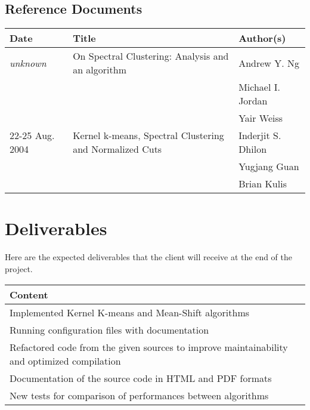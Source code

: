 \subsection{Reference Documents}
\begin{flushleft}
    \begin{tabular}{ | p{} | l | p{} |}
    \hline
    \textbf{Date} & \textbf{Title} & \textbf{Author(s)}
    \\
    \hline
    \textit{unknown} & On Spectral Clustering: Analysis and an algorithm & Andrew Y. Ng
    \\ & & Michael I. Jordan
    \\ & & Yair Weiss
    \\ 
    \hline
    22-25 Aug. 2004 & Kernel k-means, Spectral Clustering and Normalized Cuts & Inderjit S. Dhilon
    \\ & & Yugjang Guan
    \\ & & Brian Kulis
    \\ 
    \hline
    \end{tabular}
\end{flushleft}
\section{Deliverables}
Here are the expected deliverables that the client will receive at the end of the project.
\begin{flushleft}
    \begin{tabular}{ | l |}
    \hline
   	\textbf{Content}
    \\
    \hline
    Implemented Kernel K-means and Mean-Shift algorithms
    \\ 
    \hline
    Running configuration files with documentation
    \\ 
    \hline
    Refactored code from the given sources to improve maintainability and optimized compilation
    \\ 
    \hline
    Documentation of the source code in HTML and PDF formats
    \\ 
    \hline
    New tests for comparison of performances between algorithms
    \\ 
    \hline
    \end{tabular}
\end{flushleft}
